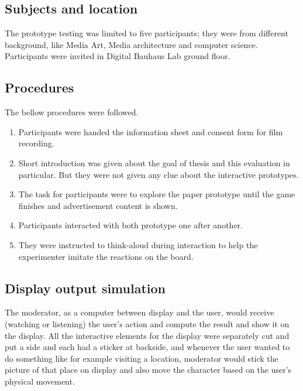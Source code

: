 \subsection{Subjects and location}
The prototype testing was limited to five participants; they were from different background, like Media Art, Media architecture and computer science. Participants were invited in Digital Bauhaus Lab ground floor.


\subsection{Procedures}

The bellow procedures were followed.

\begin{enumerate}
\item Participants were handed the information sheet and consent form for film recording.
\item Short introduction was given about the goal of thesis and this evaluation in particular. But they were not given any clue about the interactive prototypes.
\item The task for participants were to explore the paper prototype until the game finishes and advertisement content is shown.
\item Participants interacted with both prototype one after another.
\item They were instructed to think-aloud during interaction to help the experimenter imitate the reactions on the board.
\end{enumerate}


\subsection{Display output simulation}
The moderator, as a computer between display and the user, would receive (watching or listening) the user’s action and compute the result and show it on the display. All the interactive elements for the display were separately cut and put a side and each had a sticker at backside, and whenever the user wanted to do something like for example visiting a location, moderator would stick the picture of that place on display and also move the character based on the user’s physical movement.

